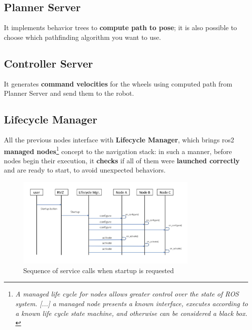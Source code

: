 \subsection*{Planner Server}

It implements behavior trees to \textbf{compute path to pose}; it is also possible to choose which pathfinding algorithm you want to use.

\subsection*{Controller Server}

It generates \textbf{command velocities} for the wheels using computed path from Planner Server and send them to the robot.



\subsection*{Lifecycle Manager}

All the previous nodes interface with \textbf{Lifecycle Manager}, which brings \acrshort{ros}2 \textbf{managed nodes}\footnote{\textit{A managed life cycle for nodes allows greater control over the state of ROS system. [...] a managed node presents a known interface, executes according to a known life cycle state machine, and otherwise can be considered a black box.} \cite{lifecycle}} concept to the navigation stack: in such a manner, before nodes begin their execution, it \textbf{checks} if all of them were \textbf{launched correctly} and are ready to start, to avoid unexpected behaviors.

\begin{figure}[h]
    \centering
    \includegraphics[width=0.8\textwidth]{images/uml_lifecycle_manager}
    \caption{Sequence of service calls when startup is requested}
\end{figure}

